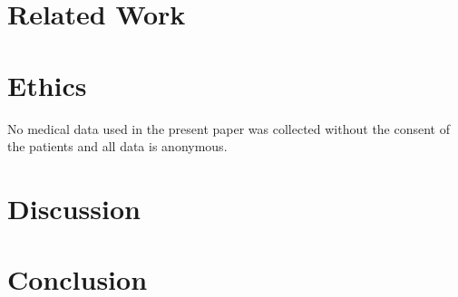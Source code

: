 \documentclass{article}
\begin{document}
\newpage
\section{Related Work}



\newpage
\section{Ethics}

No medical data used in the present paper was collected without the consent of the patients and all data is anonymous.

\section{Discussion}
\section{Conclusion}
\newpage

\nocite{*}
\medskip
\begin{multicols}{2}
\printbibliography[heading=bibintoc]
\end{multicols}
\end{document}
